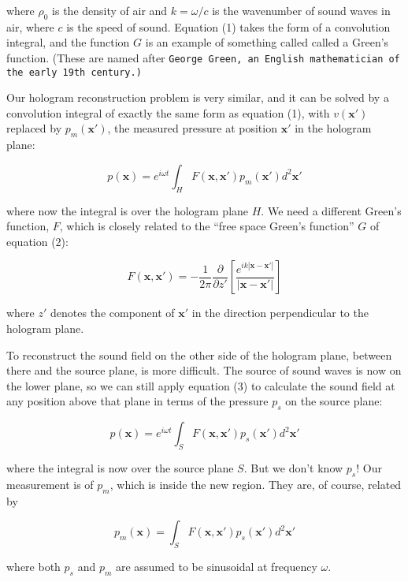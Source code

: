   where $\rho_0$ is the density of air and $k=\omega/c$ is the wavenumber of 
  sound waves in air, where $c$ is the speed of sound. Equation (1) takes the 
  form of a convolution integral, and the function $G$ is an example of 
  something called called a Green's function. (These are named after 
  \tt{}George Green\rm{}, an English mathematician of the early 19th century.) 

  Our hologram reconstruction problem is very similar, and it can be solved by 
  a convolution integral of exactly the same form as equation (1), with 
  $v(\mathbf{x'})$ replaced by $p_m(\mathbf{x'})$, the measured pressure at 
  position $\mathbf{x'}$ in the hologram plane: 

  $$p(\mathbf{x}) = e^{i \omega t} \int_H{F(\mathbf{x},\mathbf{x'}) 
  p_m(\mathbf{x'}) d^2 \mathbf{x'}} \tag{3}$$ 

  where now the integral is over the hologram plane $H$. We need a different 
  Green's function, $F$, which is closely related to the ``free space Green's 
  function'' $G$ of equation (2): 

  $$F(\mathbf{x},\mathbf{x'})=- \dfrac{1}{2 \pi} \dfrac{\partial}{\partial 
  z'}\left[ \dfrac{e^{i k 
  |\mathbf{x}-\mathbf{x'}|}}{|\mathbf{x}-\mathbf{x'}|}\right] \tag{4}$$ 

  where $z'$ denotes the component of $\mathbf{x'}$ in the direction 
  perpendicular to the hologram plane. 

  To reconstruct the sound field on the other side of the hologram plane, 
  between there and the source plane, is more difficult. The source of sound 
  waves is now on the lower plane, so we can still apply equation (3) to 
  calculate the sound field at any position above that plane in terms of the 
  pressure $p_s$ on the source plane: 

  $$p(\mathbf{x}) = e^{i \omega t} \int_S{F(\mathbf{x},\mathbf{x'}) 
  p_s(\mathbf{x'}) d^2 \mathbf{x'}} \tag{5}$$ 

  where the integral is now over the source plane $S$. But we don't know $p_s$! 
  Our measurement is of $p_m$, which is inside the new region. They are, of 
  course, related by 

  $$p_m(\mathbf{x}) = \int_S{F(\mathbf{x},\mathbf{x'}) p_s(\mathbf{x'}) d^2 
  \mathbf{x'}} \tag{6}$$ 

  where both $p_s$ and $p_m$ are assumed to be sinusoidal at frequency 
  $\omega$. 

